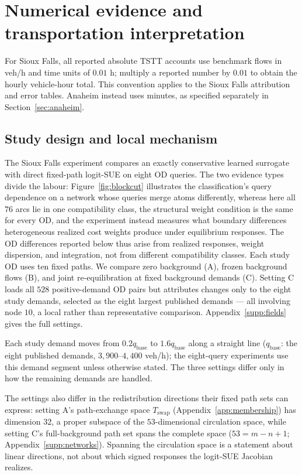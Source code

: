 \section{Numerical evidence and transportation interpretation}\label{sec:numerics}
For Sioux Falls, all reported absolute TSTT accounts use benchmark flows in veh/h and time
units of $0.01$ h; multiply a reported number by $0.01$ to obtain the
hourly vehicle-hour total. This convention applies to the Sioux Falls attribution and error tables.
Anaheim instead uses minutes, as specified separately in Section~\ref{sec:anaheim}.
\subsection{Study design and local mechanism}
The Sioux Falls experiment compares an exactly conservative learned surrogate
with direct fixed-path logit-SUE on eight OD queries. The two evidence
types divide the labour: Figure~\ref{fig:blockcut} illustrates the
classification's query dependence on a network whose queries merge atoms
differently, whereas here all $76$ arcs lie in one compatibility class,
the structural weight condition is the same for every OD, and the
experiment instead measures what boundary differences heterogeneous
realized cost weights produce under equilibrium responses. The OD
differences reported below thus arise from realized responses, weight
dispersion, and integration, not from different compatibility classes.
Each study OD uses ten
fixed paths. We compare zero background (A), frozen background flows (B),
and joint re-equilibration at fixed background demands (C). Setting C loads
all $528$ positive-demand OD pairs but attributes changes only to the eight
study demands, selected as the eight largest published demands --- all
involving node $10$, a local rather than representative comparison.
Appendix~\ref{supp:fields} gives the full settings.

Each study demand moves from $0.2q_{\mathrm{base}}$ to $1.6q_{\mathrm{base}}$
along a straight line ($q_{\mathrm{base}}$: the eight published
demands, $3{,}900$--$4{,}400$ veh/h); the eight-query experiments use this demand
segment unless otherwise stated. The three settings differ only in how
the remaining demands are handled.

The settings also differ in the redistribution directions their
fixed path sets can express: setting A's path-exchange space
$T_{\mathrm{swap}}$ (Appendix~\ref{app:membership}) has dimension
$32$, a proper subspace of the $53$-dimensional circulation space,
while setting C's full-background path set spans the complete space
($53=m-n+1$; Appendix~\ref{supp:networks}). Spanning the circulation
space is a statement about linear directions, not about which signed
responses the logit-SUE Jacobian realizes.

